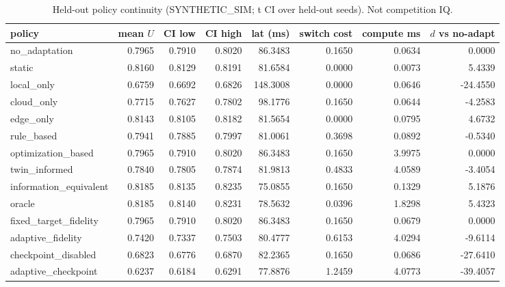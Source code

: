 \begin{table}[h]\centering
\caption{Held-out policy continuity (SYNTHETIC\_SIM; t CI over held-out seeds). Not competition IQ.}
\begin{tabular}{lrrrrrrr}\toprule
policy & mean $U$ & CI low & CI high & lat (ms) & switch cost & compute ms & $d$ vs no-adapt \\
\midrule
no\_adaptation & 0.7965 & 0.7910 & 0.8020 & 86.3483 & 0.1650 & 0.0634 & 0.0000 \\
static & 0.8160 & 0.8129 & 0.8191 & 81.6584 & 0.0000 & 0.0073 & 5.4339 \\
local\_only & 0.6759 & 0.6692 & 0.6826 & 148.3008 & 0.0000 & 0.0646 & -24.4550 \\
cloud\_only & 0.7715 & 0.7627 & 0.7802 & 98.1776 & 0.1650 & 0.0644 & -4.2583 \\
edge\_only & 0.8143 & 0.8105 & 0.8182 & 81.5654 & 0.0000 & 0.0795 & 4.6732 \\
rule\_based & 0.7941 & 0.7885 & 0.7997 & 81.0061 & 0.3698 & 0.0892 & -0.5340 \\
optimization\_based & 0.7965 & 0.7910 & 0.8020 & 86.3483 & 0.1650 & 3.9975 & 0.0000 \\
twin\_informed & 0.7840 & 0.7805 & 0.7874 & 81.9813 & 0.4833 & 4.0589 & -3.4054 \\
information\_equivalent & 0.8185 & 0.8135 & 0.8235 & 75.0855 & 0.1650 & 0.1329 & 5.1876 \\
oracle & 0.8185 & 0.8140 & 0.8231 & 78.5632 & 0.0396 & 1.8298 & 5.4323 \\
fixed\_target\_fidelity & 0.7965 & 0.7910 & 0.8020 & 86.3483 & 0.1650 & 0.0679 & 0.0000 \\
adaptive\_fidelity & 0.7420 & 0.7337 & 0.7503 & 80.4777 & 0.6153 & 4.0294 & -9.6114 \\
checkpoint\_disabled & 0.6823 & 0.6776 & 0.6870 & 82.2365 & 0.1650 & 0.0686 & -27.6410 \\
adaptive\_checkpoint & 0.6237 & 0.6184 & 0.6291 & 77.8876 & 1.2459 & 4.0773 & -39.4057 \\
\bottomrule\end{tabular}
\end{table}
